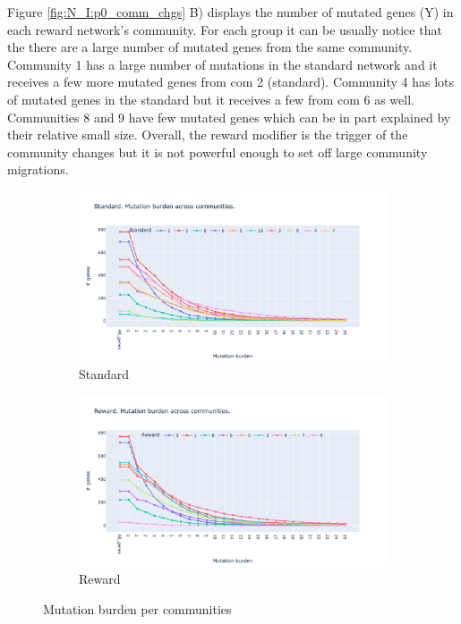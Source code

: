 Figure \ref{fig:N_I:p0_comm_chgs} B) displays the number of mutated genes (Y) in each reward network's community. For each group it can be usually notice that the there are a large number of mutated genes from the same community. Community 1 has a large number of mutations in the standard network and it receives a few more mutated genes from com 2 (standard). Community 4 has lots of mutated genes in the standard but it receives a few from com 6 as well. Communities 8 and 9 have few mutated genes which can be in part explained by their relative small size. Overall, the reward modifier is the trigger of the community changes but it is not powerful enough to set off large community migrations.


\begin{figure}[!htb]
    \hfill
    \begin{subfigure}[b]{0.49\textwidth}
        \centering
        \includegraphics[width=\textwidth,keepaspectratio]{Sections/Network_I/Resources/P0/Comms/Mut_evo_Std_4k.png}
        \caption{Standard}
    \end{subfigure}
    \begin{subfigure}[b]{0.49\textwidth}
        \centering
        \includegraphics[width=\textwidth,keepaspectratio]{Sections/Network_I/Resources/P0/Comms/Mut_evo_Rwd_4k.png}
        \caption{Reward}
    \end{subfigure}
    \caption{Mutation burden per communities}
    \label{fig:N_I:p0_mut_burden}
\end{figure}


